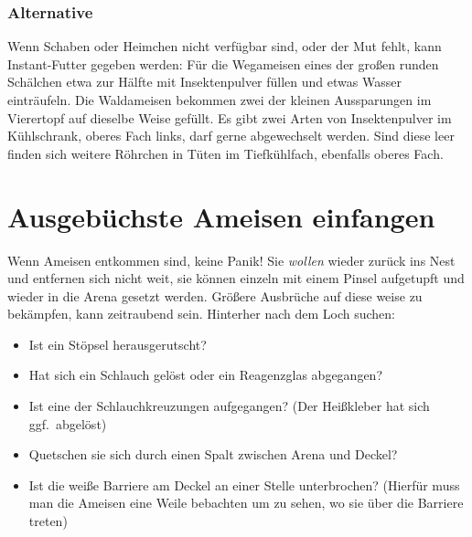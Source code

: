 \subsubsection{Alternative}
Wenn Schaben oder Heimchen nicht verfügbar sind, oder der Mut fehlt, kann Instant-Futter gegeben werden:
Für die Wegameisen eines der großen runden Schälchen etwa zur Hälfte mit Insektenpulver füllen und etwas Wasser einträufeln.
Die Waldameisen bekommen zwei der kleinen Aussparungen im Vierertopf auf dieselbe Weise gefüllt.
Es gibt zwei Arten von Insektenpulver im Kühlschrank, oberes Fach links, darf gerne abgewechselt werden. Sind diese leer finden sich weitere Röhrchen in Tüten im Tiefkühlfach, ebenfalls oberes Fach.

\section{Ausgebüchste Ameisen einfangen}
Wenn Ameisen entkommen sind, keine Panik! Sie \textit{wollen} wieder zurück ins Nest und entfernen sich nicht weit,
sie können einzeln mit einem Pinsel aufgetupft und wieder in die Arena gesetzt werden.
Größere Ausbrüche auf diese weise zu bekämpfen, kann zeitraubend sein.
Hinterher nach dem Loch suchen:
\begin{itemize}
  \item Ist ein Stöpsel herausgerutscht?
  \item Hat sich ein Schlauch gelöst oder ein Reagenzglas abgegangen?
  \item Ist eine der Schlauchkreuzungen aufgegangen? (Der Heißkleber hat sich ggf.\ abgelöst)
  \item Quetschen sie sich durch einen Spalt zwischen Arena und Deckel?
  \item Ist die weiße Barriere am Deckel an einer Stelle unterbrochen?
        (Hierfür muss man die Ameisen eine Weile bebachten um zu sehen, wo sie über die Barriere treten)
\end{itemize}
